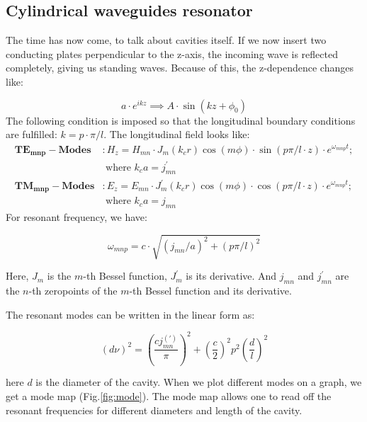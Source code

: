 \documentclass[a4paper]{report}
\numberwithin{equation}{section}
\begin{document}
\subsection{Cylindrical waveguides resonator}
The time has now come, to talk about cavities itself. If we now insert two
conducting plates perpendicular to the z-axis, the incoming wave is reflected
completely, giving us standing waves. Because of this, the z-dependence changes
like: 

\[
		a \cdot e^{ikz} \implies A \cdot \sin\left(kz + \phi_{0}\right)    
\]
The following condition is imposed so that the longitudinal boundary conditions
are fulfilled: $k = p\cdot \pi /l $. The longitudinal field looks like: 
\begin{align*}
		\mathbf{TE_{mnp}-Modes}&: H_{z} = H_{mn}\cdot J_{m} \left(k_{c}r \right) \cos\left(m \phi \right) \cdot \sin\left(p \pi / l \cdot z \right) \cdot e^{\omega_{mnp}t}; \\  &\text{ where } k_{c}a=j_{mn}^{'}  \\
		\mathbf{TM_{mnp}-Modes}&: E_{z} = E_{mn}\cdot J_{m}^{'}  \left(k_{c}r \right) \cos\left(m \phi \right) \cdot \cos\left(p \pi / l \cdot z \right) \cdot e^{\omega_{mnp}t}; \\  &\text{ where } k_{c}a=j_{mn} 
\end{align*}
For resonant frequency, we have:

\[
		\omega_{mnp} = c \cdot \sqrt{\left(j_{mn}/a\right)^2 + \left(p \pi / l\right)^2} 
\]

Here, $J_{m}$ is the $m$-th Bessel function, $J_{m}^{'} $ is its derivative. And
$j_{mn}$ and $j_{mn}^{'}$ are the $n$-th zeropoints of the $m$-th Bessel
function and its derivative.

The resonant modes can be written in the linear form as:

\begin{equation} \label{eqn:res_freq}
		\left(d \nu \right)^2 = \left(\frac{cj_{mn}^{(')}}{\pi}\right)^2 + \left(\frac{c}{2}\right)^2 p^2 \left(\frac{d}{l}\right)^2
\end{equation}

here $d$ is the diameter of the cavity. When we plot different modes on a graph,
we get a mode map (Fig.\ref{fig:mode}). The mode map allows one to read off the
resonant frequencies for different diameters and length of the cavity. 
\end{document}
